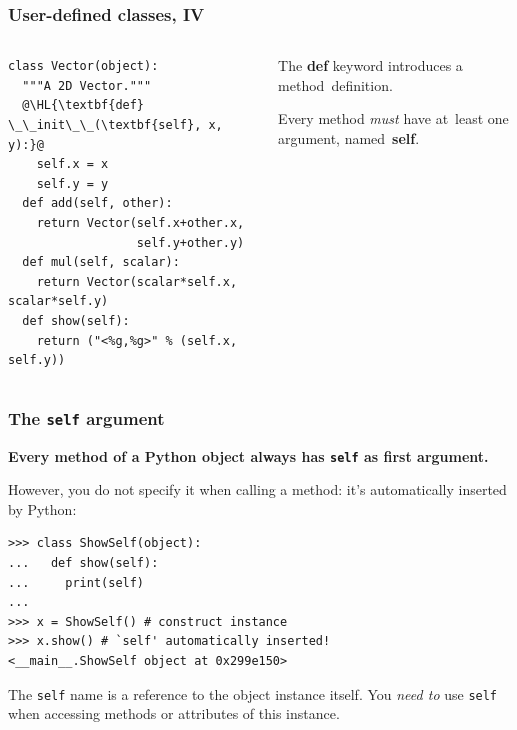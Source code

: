 \documentclass[english,serif,mathserif,xcolor=pdftex,dvipsnames,table]{beamer}
\begin{document}
\begin{frame}[fragile]
  \frametitle{User-defined classes, IV}
  \begin{columns}[t]
    \begin{column}{0.5\textwidth}
\begin{lstlisting}
class Vector(object):
  """A 2D Vector."""
  @\HL{\textbf{def} \_\_init\_\_(\textbf{self}, x, y):}@
    self.x = x
    self.y = y
  def add(self, other):
    return Vector(self.x+other.x,
                  self.y+other.y)
  def mul(self, scalar):
    return Vector(scalar*self.x, scalar*self.y)
  def show(self):
    return ("<%g,%g>" % (self.x, self.y))
\end{lstlisting}
    \end{column}
    \begin{column}{0.5\textwidth}
      \raggedleft
      The {\bf def} keyword introduces a method~definition.

      \+
      Every method \emph{must} have at~least one argument,
      named~{\bf self}.
    \end{column}
  \end{columns}
\end{frame}


\begin{frame}[fragile]
  \frametitle{The \texttt{self} argument}

  \textbf{Every method of a Python object always has \texttt{self}
    as first argument.}

  \+
  However, you do not specify it when calling a method: it's
  automatically inserted by Python:
\begin{lstlisting}
>>> class ShowSelf(object):
...   def show(self):
...     print(self)
...
>>> x = ShowSelf() # construct instance
>>> x.show() # `self' automatically inserted!
<__main__.ShowSelf object at 0x299e150>
\end{lstlisting}

  \+
  The \texttt{self} name is a reference to the object instance
  itself.  You \emph{need to} use \texttt{self} when accessing methods
  or attributes of this instance.
\end{frame}
\end{document}
